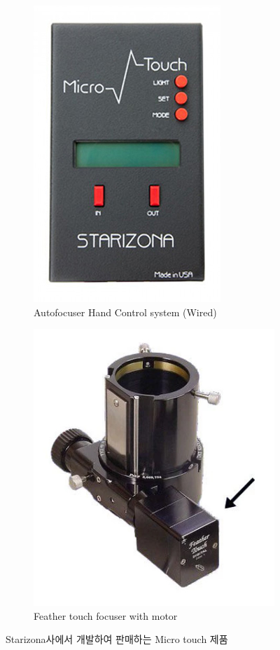 \begin{figure}[H]
		\begin{subfigure}{0.45\textwidth}
		\begin{center}
			\includegraphics[width=0.6\linewidth]{microtouch_3} 
		\end{center}			
			\caption{Autofocuser Hand Control system (Wired)}
			\label{fig:microtouch_3}
		\end{subfigure}
		\begin{subfigure}{0.5\textwidth}
		\begin{center}			
			\includegraphics[width=0.75\linewidth]{microtouch_4}
		\end{center}
			\caption{Feather touch focuser with motor}
			\label{fig:microtouch_4}
		\end{subfigure}
		\caption{Starizona사에서 개발하여 판매하는 Micro touch 제품}
		\label{fig:microtouch}
\end{figure}




